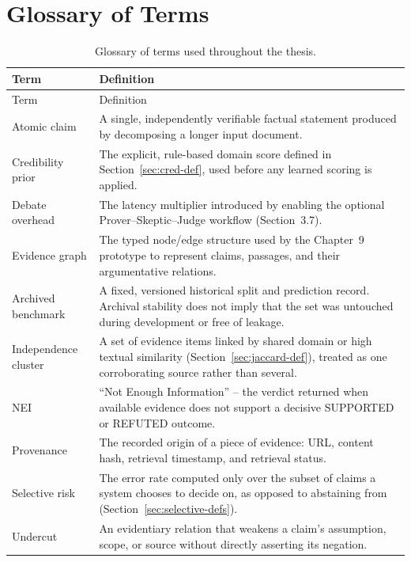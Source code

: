 \documentclass[12pt,a4paper,openany]{report}
\begin{document}
\chapter{Glossary of Terms}
\begin{longtable}{p{3.6cm}p{9.5cm}}
\caption{Glossary of terms used throughout the thesis.}\\
\toprule Term & Definition \\
\midrule
\endfirsthead
\toprule Term & Definition \\
\midrule
\endhead
Atomic claim & A single, independently verifiable factual statement produced by decomposing a longer input document. \\
Credibility prior & The explicit, rule-based domain score defined in Section~\ref{sec:cred-def}, used before any learned scoring is applied. \\
Debate overhead & The latency multiplier introduced by enabling the optional Prover--Skeptic--Judge workflow (Section~3.7). \\
Evidence graph & The typed node/edge structure used by the Chapter~9 prototype to represent claims, passages, and their argumentative relations. \\
Archived benchmark & A fixed, versioned historical split and prediction record. Archival stability does not imply that the set was untouched during development or free of leakage. \\
Independence cluster & A set of evidence items linked by shared domain or high textual similarity (Section~\ref{sec:jaccard-def}), treated as one corroborating source rather than several. \\
NEI & ``Not Enough Information'' -- the verdict returned when available evidence does not support a decisive SUPPORTED or REFUTED outcome. \\
Provenance & The recorded origin of a piece of evidence: URL, content hash, retrieval timestamp, and retrieval status. \\
Selective risk & The error rate computed only over the subset of claims a system chooses to decide on, as opposed to abstaining from (Section~\ref{sec:selective-defs}). \\
Undercut & An evidentiary relation that weakens a claim's assumption, scope, or source without directly asserting its negation. \\
\bottomrule
\end{longtable}
\end{document}
